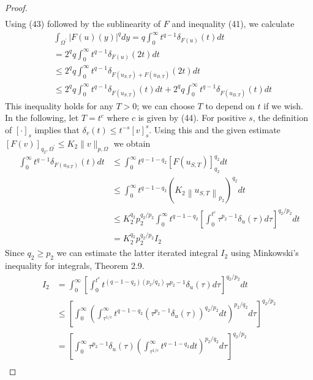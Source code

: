 \begin{proof}
\[\begin{aligned}
  \end{aligned}
  \]
  Using (43) followed by the sublinearity of $F$ and inequality (41), we calculate
  \[
  \begin{aligned}
  & \int_{\Omega^{\prime}}|F(u)(y)|^q d y=q \int_0^{\infty} t^{q-1} \delta_{F(u)}(t) d t \\
  &=2^q q \int_0^{\infty} t^{q-1} \delta_{F(u)}(2 t) d t \\
  & \leq 2^q q \int_0^{\infty} t^{q-1} \delta_{F\left(u_{S, T}\right)+F\left(u_{B, T}\right)}(2 t) d t \\
  & \leq 2^q q \int_0^{\infty} t^{q-1} \delta_{F\left(u_{S, T}\right)}(t) d t+2^q q \int_0^{\infty} t^{q-1} \delta_{F\left(u_{B, T}\right)}(t) d t
  \end{aligned}
  \]
  This inequality holds for any $T>0$; we can choose $T$ to depend on $t$ if we wish. In the following, let $T=t^c$ where $c$ is given by (44). For positive $s$, the definition of $[\cdot]_s$ implies that $\delta_v(t) \leq t^{-s}[v]_s^s$. Using this and the given estimate $[F(v)]_{q_2, \Omega^{\prime}} \leq K_2\|v\|_{p, \Omega}$ we obtain
  \[
  \begin{aligned}
  \int_0^{\infty} t^{q-1} \delta_{F\left(u_{S . T}\right)}(t) d t & \leq \int_0^{\infty} t^{q-1-q_2}\left[F\left(u_{S, T}\right)\right]_{q_2}^{q_2} d t \\
  & \leq \int_0^{\infty} t^{q-1-q_2}\left(K_2\left\|u_{S, T}\right\|_{p_2}\right)^{q_2} d t \\
  & \leq K_2^{q_2} p_2^{q_2 / p_2} \int_0^{\infty} t^{q-1-q_2}\left[\int_0^{t^c} \tau^{p_2-1} \delta_u(\tau) d \tau\right]^{q_2 / p_2} d t \\
  & =K_2^{q_2} p_2^{q_2 / p_2} I_2
  \end{aligned}
  \]
  Since $q_2 \geq p_2$ we can estimate the latter iterated integral $I_2$ using Minkowski's
  inequality for integrals, Theorem 2.9.
  \[
  \begin{aligned}
  I_2 & =\int_0^{\infty}\left[\int_0^{t^c} t^{\left(q-1-q_2\right)\left(p_2 / q_2\right)} \tau^{p_2-1} \delta_u(\tau) d \tau\right]^{q_2 / p_2} d t \\
  & \leq\left[\int_0^{\infty}\left(\int_{\tau^{1 / c}}^{\infty} t^{q-1-q_2}\left(\tau^{p_2-1} \delta_u(\tau)\right)^{q_2 / p_2} d t\right)^{p_2 / q_2} d \tau\right]^{q_2 / p_2} \\
  & =\left[\int_0^{\infty} \tau^{p_2-1} \delta_u(\tau)\left(\int_{\tau^{1 / c}}^{\infty} t^{q-1-q_2} d t\right)^{p_2 / q_2} d \tau\right]^{q_2 / p_2} \\

\end{aligned}\]
\end{proof}
